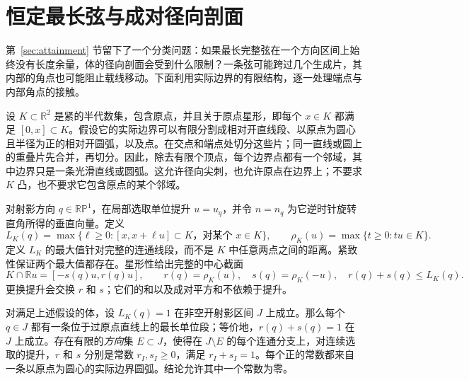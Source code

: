 \section{恒定最长弦与成对径向剖面}\label{sec:constant-length-classification}

第~\ref{sec:attainment} 节留下了一个分类问题：如果最长完整弦在一个方向区间上始终没有长度余量，体的径向剖面会受到什么限制？一条弦可能跨过几个生成片，其内部的角点也可能阻止载线移动。下面利用实际边界的有限结构，逐一处理端点与内部角点的接触。

设 $K\subset\mathbb R^2$ 是紧的半代数集，包含原点，并且关于原点星形，即每个 $x\in K$ 都满足 $[0,x]\subset K$。假设它的实际边界可以有限分割成相对开直线段、以原点为圆心且半径为正的相对开圆弧，以及点。在交点和端点处切分这些片；同一直线或圆上的重叠片先合并，再切分。因此，除去有限个顶点，每个边界点都有一个邻域，其中边界只是一条光滑直线或圆弧。这允许径向尖刺，也允许原点在边界上；不要求 $K$ 凸，也不要求它包含原点的某个邻域。

对射影方向 $q\in\mathbb {RP}^1$，在局部选取单位提升 $u=u_q$，并令 $n=n_q$ 为它逆时针旋转直角所得的垂直向量。定义
\[
 L_K(q)=\max\{\ell\ge0:[x,x+\ell u]\subset K\text{，对某个 }x\in K\},
 \qquad \rho_K(u)=\max\{t\ge0:tu\in K\}.
\]
定义 $L_K$ 的最大值针对完整的连通线段，而不是 $K$ 中任意两点之间的距离。紧致性保证两个最大值都存在。星形性给出完整的中心截面
\[
 K\cap\mathbb Ru=[-s(q)u,r(q)u],\qquad
 r(q)=\rho_K(u),\quad s(q)=\rho_K(-u),\quad r(q)+s(q)\le L_K(q).
\]
更换提升会交换 $r$ 和 $s$；它们的和以及成对平方和不依赖于提升。

\begin{lemma}[恒长区间上的分类]\label{lem:constant-length-classification}
对满足上述假设的体，设 $L_K(q)=1$ 在非空开射影区间 $J$ 上成立。那么每个 $q\in J$ 都有一条位于过原点直线上的最长单位段；等价地，$r(q)+s(q)=1$ 在 $J$ 上成立。存在有限的\emph{方向}集 $E\subset J$，使得在 $J\setminus E$ 的每个连通分支上，对连续选取的提升，$r$ 和 $s$ 分别是常数 $r_I,s_I\ge0$，满足 $r_I+s_I=1$。每个正的常数都来自一条以原点为圆心的实际边界圆弧。结论允许其中一个常数为零。
\end{lemma}

